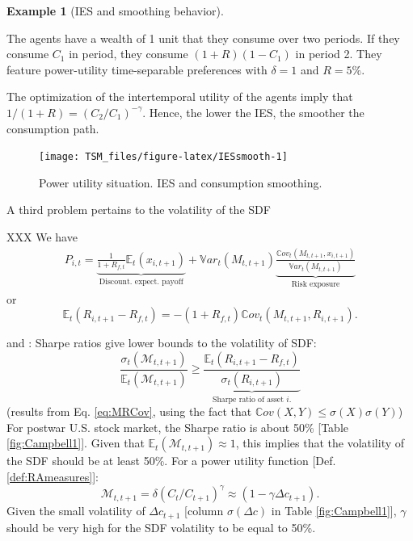 \documentclass[
  12pt,
]{book}
\theoremstyle{definition}
\theoremstyle{definition}
\newtheorem{example}{Example}[chapter]
\theoremstyle{definition}
\theoremstyle{definition}
\theoremstyle{remark}
\begin{document}
\begin{example}[IES and smoothing behavior]
\protect\hypertarget{exm:IESsmoothing}{}\label{exm:IESsmoothing}

The agents have a wealth of 1 unit that they consume over two periods. If they consume \(C_1\) in period, they consume \((1+R)(1-C_1)\) in period 2. They feature power-utility time-separable preferences with \(\delta=1\) and \(R=5\%\).

The optimization of the intertemporal utility of the agents imply that \(1/(1+R)=(C_2/C_1)^{-\gamma}\). Hence, the lower the IES, the smoother the consumption path.

\begin{figure}
\texttt{[image: TSM\_files/figure-latex/IESsmooth-1]} \caption{Power utility situation. IES and consumption smoothing.}\label{fig:IESsmooth}
\end{figure}

\end{example}

A third problem pertains to the volatility of the SDF

XXX We have
\begin{eqnarray*}
P_{i,t} = \underbrace{\frac{1}{1 + R_{f,t}} \mathbb{E}_t(x_{i,t+1})}_{\mbox{Discount.  expect. payoff}} + \mathbb{V}ar_t(M_{t,t+1}) \underbrace{\frac{\mathbb{C}ov_t(M_{t,t+1},x_{i,t+1})}{\mathbb{V}ar_t(M_{t,t+1})}}_{\mbox{Risk exposure}}
\end{eqnarray*}
or
\begin{equation}
\boxed{\mathbb{E}_t(R_{i,t+1} - R_{f,t}) = - (1 + R_{f,t}) \mathbb{C}ov_t(M_{t,t+1},R_{i,t+1}).}\label{eq:MRCov}
\end{equation}

\citet{Grossman_Shiller_1981} and \citet{Hansen_Jagannathan_1991}: Sharpe ratios give lower bounds to the volatility of SDF:
\[
\frac{\sigma_t(\mathcal{M}_{t,t+1})}{\mathbb{E}_t(\mathcal{M}_{t,t+1})} \ge \underbrace{\frac{\mathbb{E}_t(R_{i,t+1}-R_{f,t})}{\sigma_t(R_{i,t+1})}}_{\mbox{Sharpe ratio of asset $i$.}}
\]
(results from Eq. \eqref{eq:MRCov}, using the fact that \(\mathbb{C}ov(X,Y) \le \sigma(X)\sigma(Y)\))
For postwar U.S. stock market, the Sharpe ratio is about 50\% {[}Table \ref{fig:Campbell1}{]}. Given that \(\mathbb{E}_t(\mathcal{M}_{t,t+1}) \approx 1\), this implies that the volatility of the SDF should be at least 50\%.
For a power utility function {[}Def. \ref{def:RAmeasures}{]}:
\[
\mathcal{M}_{t,t+1}=\delta (C_t/C_{t+1})^\gamma \approx (1 - \gamma \Delta c_{t+1}).
\]
Given the small volatility of \(\Delta c_{t+1}\) {[}column \(\sigma(\Delta c)\) in Table \ref{fig:Campbell1}{]}, \(\gamma\) should be very high for the SDF volatility to be equal to 50\%.
\end{document}
